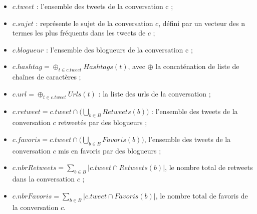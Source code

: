 \documentclass{article-hermes}
\begin{document}
\begin{itemize}
\item $c.tweet$ : l'ensemble des tweets de la conversation c ;
\item $c.sujet$ : représente le sujet de la conversation $c$, défini par un vecteur des n termes les plus fréquents dans les tweets de $c$ ;
\item $c.blogueur$ : l'ensemble des blogueurs de la conversation c ;
\item $c.hashtag =  \oplus_{t \in c.tweet} Hashtags(t)$, avec $\oplus$ la concaténation de liste de chaînes de caractères ; 
\item $c.url =  \oplus _{t \in c.tweet} Urls(t)$ : la liste des urls de la  conversation ;
\item$ c.retweet = c.tweet \cap \Big( \bigcup_{b \in B} Retweets(b) \Big)$ : l'ensemble des tweets de la conversation $c$ retweetés par des blogueurs ;
\item $c.favoris = c.tweet \cap \Big( \bigcup_{b \in B} Favoris(b) \Big)$, l'ensemble des tweets de la conversation $c$ mis en favoris par des blogueurs ;
\item $c.nbrRetweets = \sum_{b \in B} |c.tweet \cap Retweets(b)|$, le nombre total de retweets dans la conversation $c$ ;
\item $c.nbrFavoris = \sum_{b \in B} |c.tweet \cap Favoris(b)|$, le nombre total de favoris de la conversation $c$.
\end{itemize}
\end{document}
